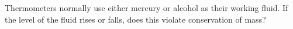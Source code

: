 Thermometers normally use either mercury or alcohol as their working fluid.
        If the level of the fluid rises or falls, does this violate conservation of mass?
